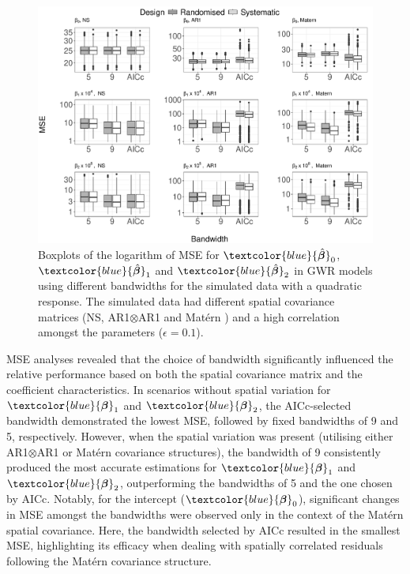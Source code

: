 \documentclass[a4paper]{article} 	%
\newcommand{\Matern}{Mat\'ern }
\newcommand{\zc}[1]{\textcolor{blue}{#1}}
\begin{document}
\begin{figure}[!thp]
	\centering
	\includegraphics[width=\linewidth]{Expt/Col_QuaCombMSE_newpar_eta01_V3.pdf}
	\caption{Boxplots of the logarithm of MSE for $\zc{\hat{\bm{\beta}}}_0$, $\zc{\hat{\bm{\beta}}}_1$ and $\zc{\hat{\bm{\beta}}}_2$ in GWR models using different bandwidths for the simulated data with a quadratic response. The simulated data had different spatial covariance matrices (NS, AR1$\otimes$AR1 and \Matern) and a high correlation amongst the parameters ($\epsilon=0.1$).} \label{fig:QuadBetaMSEeta01}
\end{figure}


MSE analyses revealed that the choice of bandwidth significantly influenced the relative performance based on both the spatial covariance matrix and the coefficient characteristics. In scenarios without spatial variation for $\zc{\bm{\beta}}_1$ and $\zc{\bm{\beta}}_2$, the AICc-selected bandwidth demonstrated the lowest MSE, followed by fixed bandwidths of 9 and 5, respectively. However, when the spatial variation was present (utilising either AR1$\otimes$AR1 or \Matern covariance structures), the bandwidth of 9 consistently produced the most accurate estimations for $\zc{\bm{\beta}}_1$ and $\zc{\bm{\beta}}_2$, outperforming the bandwidths of 5 and the one chosen by AICc. Notably, for the intercept ($\zc{\bm{\beta}}_0$), significant changes in MSE amongst the bandwidths were observed only in the context of the \Matern spatial covariance. Here, the bandwidth selected by AICc resulted in the smallest MSE, highlighting its efficacy when dealing with spatially correlated residuals following the \Matern covariance structure. 
\end{document}
